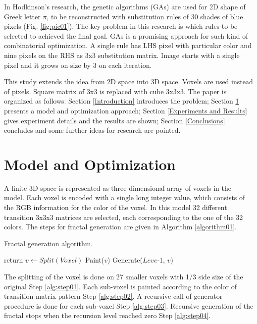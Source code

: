 \documentclass{llncs}
\begin{document}
In Hodkinson's research, the genetic algorithms (GAs) are used for 2D shape of Greek letter $\pi$, to be reconstructed with substitution rules of 30 shades of blue pixels (Fig. \ref{fig:pic01}). The key problem in this research is which rules to be selected to achieved the final goal. GAs is a promising approach for such kind of combinatorial optimization. A single rule has LHS pixel with particular color and nine pixels on the RHS as 3x3 substitution matrix. Image starts with a single pixel and it grows on size by 3 on each iteration. 

This study extends the idea from 2D space into 3D space. Voxels are used instead of pixels. Square matrix of 3x3 is replaced with cube 3x3x3. The paper is organized as follows: Section \ref{Introduction} introduces the problem; Section \ref{Model and Optimization} presents a model and optimization approach; Section \ref{Experiments and Results} gives experiment details and the results are shown; Section \ref{Conclusions} concludes and some further ideas for research are pointed.

\section{Model and Optimization} \label{Model and Optimization}

A finite 3D space is represented as three-dimensional array of voxels in the model. Each voxel is encoded with a single long integer value, which consists of the RGB information for the color of the voxel. In this model 32 different transition 3x3x3 matrices are selected, each corresponding to the one of the 32 colors. The steps for fractal generation are given in Algorithm \ref{algorithm01}.

\begin{algorithm}
\caption{Fractal generation algorithm.}\label{algorithm01}
\begin{algorithmic}[1]
  \State return\label{alg:step04}
\EndIf
\State $v\gets Split(Voxel)$\label{alg:step01}
  \State Paint($v$)\label{alg:step02}
  \State Generate($Leve$-1, $v$)\label{alg:step03}
\EndFor
\EndProcedure
\end{algorithmic}
\end{algorithm}
\FloatBarrier

The splitting of the voxel is done on 27 smaller voxels with 1/3 side size of the original Step \ref{alg:step01}. Each sub-voxel is painted according to the color of transition matrix pattern Step \ref{alg:step02}. A recursive call of generator procedure is done for each sub-voxel Step \ref{alg:step03}. Recursive generation of the fractal stops when the recursion level reached zero Step \ref{alg:step04}.
\end{document}
